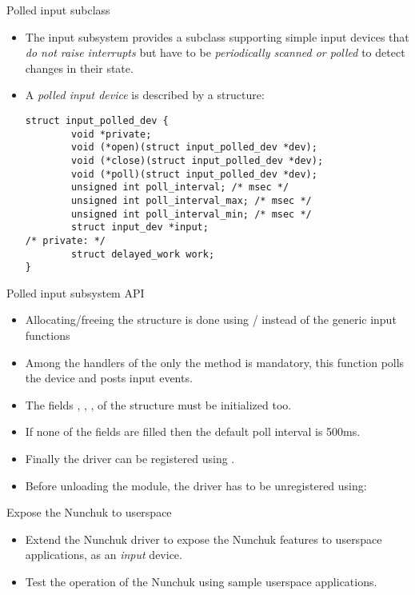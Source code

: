 \begin{frame}[fragile]{Polled input subclass}
  \begin{itemize}
  \item The input subsystem provides a subclass supporting simple input
    devices that {\em do not raise interrupts} but have to be {\em
      periodically scanned or polled} to detect changes in their
    state.
  \item A {\em polled input device} is described by a
     structure:
    \begin{verbatim}
struct input_polled_dev {
        void *private;
        void (*open)(struct input_polled_dev *dev);
        void (*close)(struct input_polled_dev *dev);
        void (*poll)(struct input_polled_dev *dev);
        unsigned int poll_interval; /* msec */
        unsigned int poll_interval_max; /* msec */
        unsigned int poll_interval_min; /* msec */
        struct input_dev *input;
/* private: */
        struct delayed_work work;
}
    \end{verbatim}
  \end{itemize}
\end{frame}

\begin{frame}[fragile]{Polled input subsystem API}
  \begin{itemize}
  \item Allocating/freeing the  structure is
    done using /
     instead of the generic input
    functions
  \item Among the handlers of the  only
    the  method is mandatory, this function polls the
    device and posts input events.
  \item The fields , , ,  of
    the  structure must be initialized too.
  \item If none of the  fields are filled then the
    default poll interval is 500ms.
  \item Finally the driver can be registered using
    .
  \item Before unloading the module, the driver has to be unregistered
    using:
  \end{itemize}
\end{frame}

\setuplabframe
{Expose the Nunchuk to userspace}
{
  \begin{itemize}
  \item Extend the Nunchuk driver to expose the Nunchuk features to
    userspace applications, as an {\em input} device.
  \item Test the operation of the Nunchuk using sample userspace
    applications.
  \end{itemize}
}
